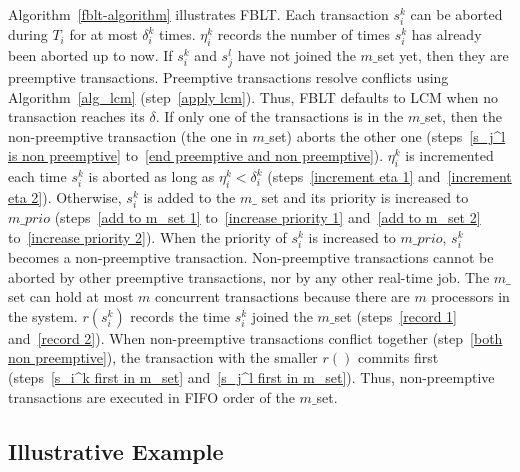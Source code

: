 \documentclass[prodmode,acmtecs]{acmsmall}
\begin{document}
Algorithm~\ref{fblt-algorithm} illustrates FBLT. Each transaction $s_{i}^{k}$ can be aborted during $T_i$ for at most $\delta_{i}^{k}$ times. $\eta_{i}^{k}$ records  the number of times $s_{i}^{k}$ has already been aborted up to now. If $s_i^k$ and $s_j^l$ have not joined the $m\_$set yet, then they are preemptive transactions. Preemptive transactions resolve conflicts using Algorithm~\ref{alg_lcm} (step~\ref{apply lcm}). Thus, FBLT defaults to LCM when no transaction reaches its $\delta$. If only one of the transactions is in the $m\_$set, then the non-preemptive transaction (the one in $m\_$set) aborts the other one (steps~\ref{s_j^l is non preemptive} to~\ref{end preemptive and non preemptive}). $\eta_i^k$ is incremented each time $s_i^k$ is aborted as long as $\eta_i^k < \delta_i^k$ (steps~\ref{increment eta 1} and~\ref{increment eta 2}). Otherwise, $s_i^k$ is added to the $m\_$ set and its priority is increased to $m\_prio$ (steps~\ref{add to m_set 1} to~\ref{increase priority 1} and~\ref{add to m_set 2} to~\ref{increase priority 2}). When the priority of $s_i^k$ is increased to $m\_prio$, $s_i^k$ becomes a non-preemptive transaction. Non-preemptive transactions cannot be aborted by other preemptive transactions, nor by any other real-time job. The $m\_$set can hold at most $m$ concurrent transactions because there are $m$ processors in the system. $r(s_i^k)$ records the time $s_i^k$ joined the $m\_$set (steps~\ref{record 1} and~\ref{record 2}). When non-preemptive transactions conflict together (step~\ref{both non preemptive}), the transaction with the smaller $r()$ commits first (steps~\ref{s_i^k first in m_set} and~\ref{s_j^l first in m_set}). Thus, non-preemptive transactions are executed in FIFO order of the $m\_$set.

\subsection{Illustrative Example}
\end{document}
